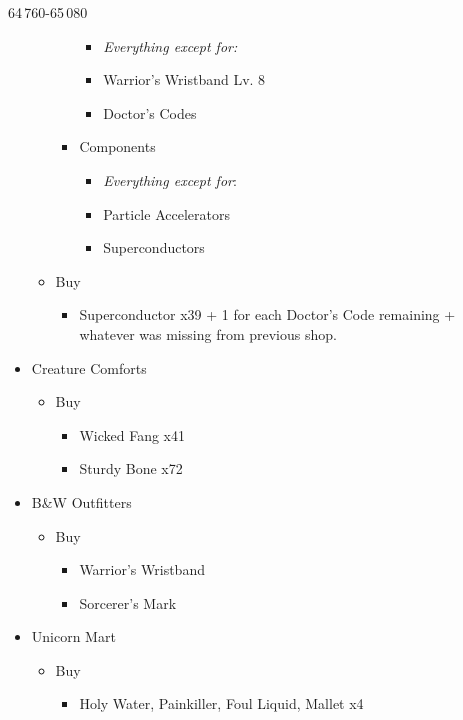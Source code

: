 \begin{multicols}{2}
\begin{shop}{64\,760-65\,080}
\begin{itemize}
\begin{itemize}
\begin{itemize}
\begin{itemize}
						                  \item \textit{Everything except for:}
						                  \item Warrior's Wristband Lv. 8
						                  \item Doctor's Codes
					                  \end{itemize}
					            \item Components
					                  \begin{itemize}
						                  \item \textit{Everything except for}:
						                  \item Particle Accelerators
						                  \item Superconductors
					                  \end{itemize}
				            \end{itemize}
				      \item Buy
				            \begin{itemize}
					            \item Superconductor x39 + 1 for each Doctor's Code remaining + whatever was missing from previous shop.
				            \end{itemize}
			      \end{itemize}
			\item Creature Comforts
			      \begin{itemize}
				      \item Buy
				            \begin{itemize}
					            \item Wicked Fang x41
					            \item Sturdy Bone x72
				            \end{itemize}
			      \end{itemize}
			\item B\&W Outfitters
			      \begin{itemize}
				      \item Buy
				            \begin{itemize}
					            \item Warrior's Wristband
					            \item Sorcerer's Mark
				            \end{itemize}
			      \end{itemize}
			\item Unicorn Mart
			      \begin{itemize}
				      \item Buy
				            \begin{itemize}
					            \item Holy Water, Painkiller, Foul Liquid, Mallet x4
				            \end{itemize}
			      \end{itemize}
		\end{itemize}
	\end{shop}


\end{multicols}
